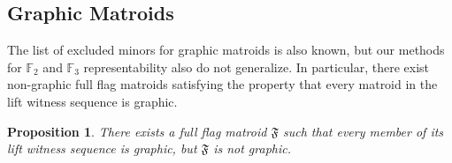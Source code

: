\documentclass[12pt]{article}
\newtheorem{prop}[thm]{Proposition}
\theoremstyle{definition}
\begin{document}
\subsection{Graphic Matroids}

The list of excluded minors for graphic matroids is also known,
but our methods for $\mathbb{F}_2$ and $\mathbb{F}_3$ representability also do not generalize.
In particular, there exist non-graphic full flag matroids satisfying the property that every matroid in the lift witness sequence is graphic.


\begin{prop}\label{prop: lift witness sequence graphic does not imply flag matroid graphic}
    There exists a full flag matroid $\mathfrak{F}$ such that every member of its lift witness sequence is graphic, but $\mathfrak{F}$ is not graphic. 
\end{prop}
\end{document}
